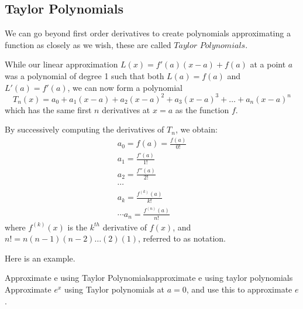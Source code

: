 \subsection{Taylor Polynomials}\label{sec:Taylor}
We can go beyond first order derivatives to create polynomials approximating a function as closely as we wish, these are called $Taylor$ $Polynomials$.

While our linear approximation $L(x)=f'(a)(x-a)+f(a)$ at a point $a$ was a polynomial of degree 1 such that both $L(a)=f(a)$ and $L'(a)=f'(a)$, we can now form a polynomial
\[ T_n(x)=a_0+a_1(x-a)+a_2(x-a)^2+a_3(x-a)^3+\dots +a_n(x-a)^n \]
which has the same first $n$ derivatives at $x=a$ as the function $f$.

By successively computing the derivatives of $T_n$, we obtain:
\[ \begin{array}{l}
a_0 = f(a)=\frac{f(a)}{0!}\\
a_1 = \frac{f'(a)}{1!}\\
a_2 = \frac{f''(a)}{2!}\\
\cdots \\
a_k = \frac{f^{(k)}(a)}{k!}\\
\cdots a_n =\frac{f^{(n)}(a)}{n!}
\end{array} \]
where $f^{(k)}(x)$ is the $k^{th}$ derivative of $f(x)$, and
$n!=n(n-1)(n-2)\ldots (2)(1) $, referred to as  notation.

Here is an example.

\begin{example}{Approximate e using Taylor Polynomials}{approximate e using taylor polynomials}
Approximate $e^x$ using Taylor polynomials at $a=0$, and use this to approximate $e$.
\end{example}

